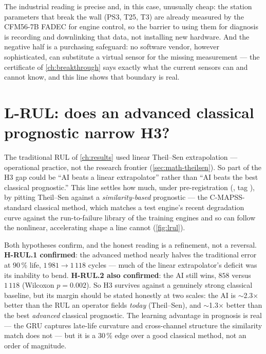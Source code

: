 The industrial reading is precise and, in this case, unusually cheap: the station parameters
that break the wall (PS3, T25, T3) are already measured by the CFM56-7B FADEC for engine
control, so the barrier to using them for diagnosis is recording and downlinking that data,
not installing new hardware. And the negative half is a purchasing safeguard: no software vendor,
however sophisticated, can substitute a virtual sensor for the missing measurement --- the
certificate of \cref{ch:breakthrough} says exactly what the current sensors can and cannot
know, and this line shows that boundary is real.

\section{L-RUL: does an advanced classical prognostic narrow H3?}
\label{sec:f8-lrul}

The traditional RUL of \cref{ch:results} used linear Theil--Sen extrapolation --- operational
practice, not the research frontier (\cref{sec:math-theilsen}). So part of the H3 gap could be
``AI beats a linear extrapolator'' rather than ``AI beats the best classical prognostic.''
This line settles how much, under pre-registration (, tag
), by pitting Theil--Sen against a \emph{similarity-based} prognostic --- the
C-MAPSS-standard classical method, which matches a test engine's recent degradation curve
against the run-to-failure library of the training engines and so can follow the nonlinear,
accelerating shape a line cannot (\cref{fig:lrul}).

Both hypotheses confirm, and the honest reading is a refinement, not a reversal.
\textbf{H-RUL.1 confirmed}: the advanced method nearly halves the traditional error at
$90\,\%$ life, $1\,981 \to 1\,118$ cycles --- much of the linear extrapolator's deficit was
its inability to bend. \textbf{H-RUL.2 also confirmed}: the AI still wins, $858$ versus
$1\,118$ (Wilcoxon $p = 0.002$). So H3 survives against a genuinely strong classical baseline,
but its margin should be stated honestly at two scales: the AI is $\sim$2.3$\times$ better than
the RUL an operator fields \emph{today} (Theil--Sen), and $\sim$1.3$\times$ better than the
best \emph{advanced} classical prognostic. The learning advantage in prognosis is real ---
the GRU captures late-life curvature and cross-channel structure the similarity match does
not --- but it is a $30\,\%$ edge over a good classical method, not an order of magnitude.

